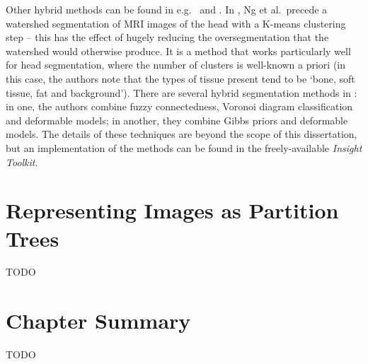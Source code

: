 Other hybrid methods can be found in e.g.~\cite{ng06} and \cite{itk}. In \cite{ng06}, Ng et al.\ precede a watershed segmentation of MRI images of the head with a K-means clustering step -- this has the effect of hugely reducing the oversegmentation that the watershed would otherwise produce. It is a method that works particularly well for head segmentation, where the number of clusters is well-known a priori (in this case, the authors note that the types of tissue present tend to be `bone, soft tissue, fat and background'). There are several hybrid segmentation methods in \cite{itk}: in one, the authors combine fuzzy connectedness, Voronoi diagram classification and deformable models; in another, they combine Gibbs priors and deformable models. The details of these techniques are beyond the scope of this dissertation, but an implementation of the methods can be found in the freely-available \emph{Insight Toolkit}.

\section{Representing Images as Partition Trees}
\label{sec:background-partitiontrees}

TODO

\section{Chapter Summary}

TODO
